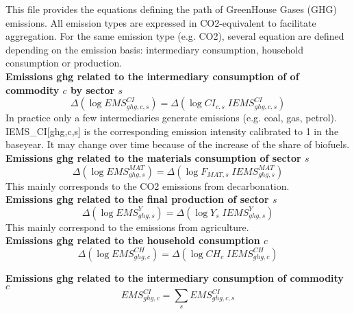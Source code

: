 \documentclass[12pt]{article}
\numberwithin{equation}{section}
\begin{document}
This file provides the equations defining the path of GreenHouse Gases (GHG) emissions. All emission types are expressed in CO2-equivalent to facilitate aggregation. For the same emission type (e.g. CO2), several equation are defined depending on the emission basis: intermediary consumption, household consumption or production. \\


\noindent\textbf{Emissions ghg related to the intermediary consumption of of commodity $c$ by sector $s$} \\
\begin{dmath}
\varDelta \left(\operatorname{log} EMS^{CI}_{ghg, c, s}\right) = \varDelta \left(\operatorname{log} CI_{c, s} \; IEMS^{CI}_{ghg, c, s}\right)
\end{dmath}
In practice only a few intermediaries generate emissions (e.g. coal, gas, petrol). IEMS_CI[ghg,c,s] is the corresponding emission intensity calibrated to 1 in the baseyear. It may change over time because of the increase of the share of biofuels. \\

\noindent\textbf{Emissions ghg related to the  materials consumption of sector $s$} \\
\begin{dmath}
\varDelta \left(\operatorname{log} EMS^{MAT}_{ghg, s}\right) = \varDelta \left(\operatorname{log} F_{MAT, s} \; IEMS^{MAT}_{ghg, s}\right)
\end{dmath}
This mainly corresponds to the CO2 emissions from decarbonation. \\

\noindent\textbf{Emissions ghg related to the final production of sector $s$} \\
\begin{dmath}
\varDelta \left(\operatorname{log} EMS^{Y}_{ghg, s}\right) = \varDelta \left(\operatorname{log} Y_{s} \; IEMS^{Y}_{ghg, s}\right)
\end{dmath}
This mainly correspond to the emissions from agriculture. \\

\noindent\textbf{Emissions ghg related to the household consumption $c$} \\
\begin{dmath}
\varDelta \left(\operatorname{log} EMS^{CH}_{ghg, c}\right) = \varDelta \left(\operatorname{log} CH_{c} \; IEMS^{CH}_{ghg, c}\right)
\end{dmath}

\noindent\textbf{Emissions ghg related to the intermediary consumption of commodity $c$} \\
\begin{dmath}
EMS^{CI}_{ghg, c} = \sum_{s} EMS^{CI}_{ghg, c, s}
\end{dmath}
\end{document}
